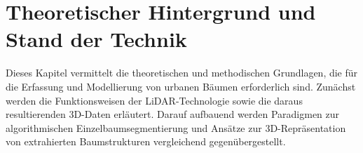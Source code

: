 \section{Theoretischer Hintergrund und Stand der Technik}

Dieses Kapitel vermittelt die theoretischen und methodischen Grundlagen, die für die Erfassung und Modellierung von urbanen Bäumen erforderlich sind. Zunächst werden die Funktionsweisen der LiDAR-Technologie sowie die daraus resultierenden 3D-Daten erläutert. Darauf aufbauend werden Paradigmen zur algorithmischen Einzelbaumsegmentierung und Ansätze zur 3D-Repräsentation von extrahierten Baumstrukturen vergleichend gegenübergestellt.
